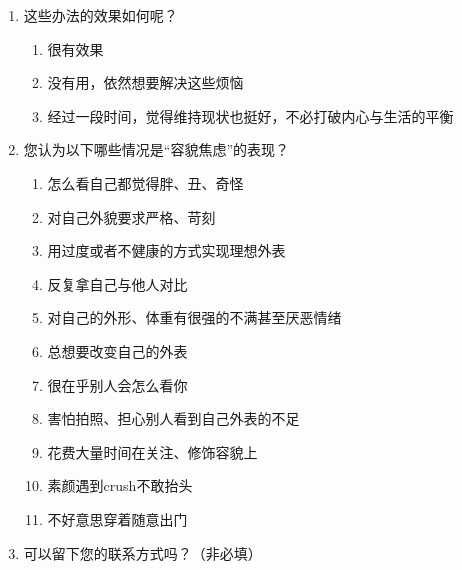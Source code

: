 \begin{enumerate}[label=第\arabic{*}题、, leftmargin=7em]
    \item 这些办法的效果如何呢？
    \begin{enumerate}[label=\Alph*.]
        \item 很有效果
        \item 没有用，依然想要解决这些烦恼
        \item 经过一段时间，觉得维持现状也挺好，不必打破内心与生活的平衡

    \end{enumerate}
    \item 您认为以下哪些情况是``容貌焦虑''的表现？
    \begin{enumerate}[label=\Alph*.]
        \item 怎么看自己都觉得胖、丑、奇怪
        \item 对自己外貌要求严格、苛刻
        \item 用过度或者不健康的方式实现理想外表
        \item 反复拿自己与他人对比
        \item 对自己的外形、体重有很强的不满甚至厌恶情绪
        \item 总想要改变自己的外表
        \item 很在乎别人会怎么看你
        \item 害怕拍照、担心别人看到自己外表的不足
        \item 花费大量时间在关注、修饰容貌上
        \item 素颜遇到crush不敢抬头
        \item 不好意思穿着随意出门
    \end{enumerate}

    \item 可以留下您的联系方式吗？（非必填）

\end{enumerate}